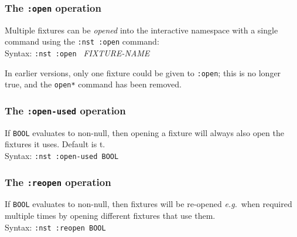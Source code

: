 \subsubsection{The \texttt{:open{\textasteriskcentered}} operation}
%
Multiple fixtures can be \emph{opened} into the
interactive namespace with a single command using the
\texttt{:nst~:open} command:
\\ Syntax: \texttt{:nst :open\* } {\textit{FIXTURE-NAME}{\textasteriskcentered}}
\par
In earlier versions, only one fixture could be given to
\texttt{:open}; this is no longer true, and the \texttt{open*} command
has been removed.

\subsubsection{The \texttt{:open-used} operation}
%
If \texttt{BOOL} evaluates to non-null, then opening a fixture will
always also open the fixtures it uses.  Default is t.
\\ Syntax: \texttt{:nst :open-used BOOL}

\subsubsection{The \texttt{:reopen} operation}
%
If \texttt{BOOL} evaluates to non-null, then fixtures will be
re-opened \emph{e.g.}\ when required multiple times by opening
different fixtures that use them.
\\ Syntax: \texttt{:nst :reopen BOOL}

